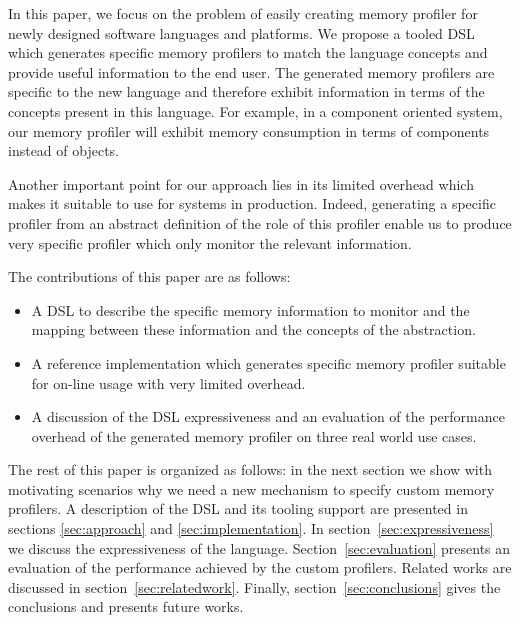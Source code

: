 In this paper, we focus on the problem of easily creating memory profiler for newly designed software languages and platforms. 
We propose a tooled DSL which generates specific memory profilers to match the language concepts and provide useful information to the end user. 
The generated memory profilers are specific to the new language and therefore exhibit information in terms of the concepts present in this language. 
For example, in a component oriented system, our memory profiler will exhibit memory consumption in terms of components instead of objects.

Another important point for our approach lies in its limited overhead which makes it suitable to use for systems in production.
Indeed, generating a specific profiler from an abstract definition of the role of this profiler enable us to produce very specific profiler which only monitor the relevant information.

The contributions of this paper are as follows:
\begin{itemize}
\item A DSL to describe the specific memory information to monitor and the mapping between these information and the concepts of the abstraction. 
\item A reference implementation which generates specific memory profiler suitable for on-line usage with very limited overhead.
\item A discussion of the DSL expressiveness and an evaluation of the performance overhead of the generated memory profiler on three real world use cases.
\end{itemize}

The rest of this paper is organized as follows: in the next section we show with motivating scenarios why we need a new mechanism to specify custom memory profilers.
A description of the DSL and its tooling support are presented in sections
\ref{sec:approach} and \ref{sec:implementation}.
In section~\ref{sec:expressiveness} we discuss the expressiveness of the language.
Section~\ref{sec:evaluation} presents an evaluation of the performance achieved by the custom profilers.
Related works are discussed in section~\ref{sec:relatedwork}.
Finally, section~\ref{sec:conclusions} gives the conclusions and presents future works.